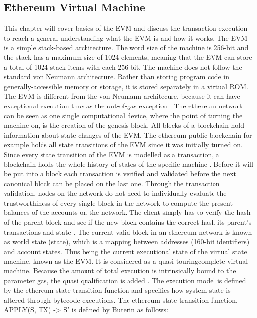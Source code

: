 \subsection{Ethereum Virtual Machine}
\label{subsec:background:first_section:ethereum}
This chapter will cover basics of the \ac{EVM} and discuss the transaction execution to reach a general understanding what the \ac{EVM} is and how it works. The \ac{EVM} is a simple stack-based architecture. The word size of the machine is 256-bit and the stack has a maximum size of 1024 elements, meaning that the \ac{EVM} can store a total of 1024 stack items with each 256-bit. The machine does not follow the standard von Neumann architecture. Rather than storing program code in generally-accessible memory or storage, it is stored separately in a virtual ROM. The \ac{EVM} is different from the von Neumann architecure, because it can have exceptional execution thus as the out-of-gas exception \cite{wood2014ethereum}. The ethereum network can be seen as one single computational device, where the point of turning the machine on, is the creation of the genesis block. All blocks of a blockchain hold information about state changes of the \ac{EVM}. The ethereum public blockchain for example holds all state transitions of the \ac{EVM} since it was initially turned on. Since every state transition of the \ac{EVM} is modelled as a transaction, a blockchain holds the whole history of states of the specific machine \cite{dannen2017introducing}. Before it will be put into a block each transaction is verified and validated before the next canonical block can be placed on the last one. Through the transaction validation, nodes on the network do not need to individually evaluate the trustworthiness of every single block in the network to compute the present balances of the accounts on the network. The client simply has to verify the hash of the parent block and see if the new block contains the correct hash its parent’s transactions and state \cite{dannen2017introducing}. The current valid block in an ethereum network is known as world state (state), which is a mapping between addresses (160-bit identifiers) and account states. Thus being the current executional state of the virtual state machine, known as the \ac{EVM}. It is considered as a quasi-touringcomplete virtual machine. Because the amount of total execution is intrinsically bound to the parameter gas, the quasi  qualification is added \cite{wood2014ethereum}. The execution model is defined by the ethereum state transition function and specifies how system state is altered through bytecode executions. \newline \newline
The ethereum state transition function, APPLY(S, TX) -> S' is defined by Buterin \cite{buterin2013ethereum}  as follows:

